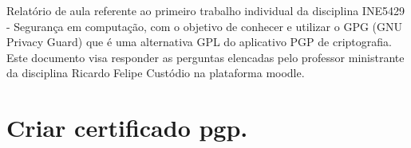 \documentclass[
    article,            %
    11pt,               %
    oneside,            %
    a4paper,            %
    english,            %
    brazil,             %
    sumario=tradicional,
    ]{abntex2}
\begin{document}

\frenchspacing 


%
%

\maketitle


\begin{resumoumacoluna}
    Relatório de aula referente ao primeiro trabalho individual da disciplina INE5429 - Segurança em computação, com o objetivo de conhecer e utilizar o GPG (GNU Privacy Guard) que é uma alternativa GPL do aplicativo PGP de criptografia. Este documento visa responder as perguntas elencadas pelo professor ministrante da disciplina Ricardo Felipe Custódio na plataforma moodle.
 
 \vspace{\onelineskip}
 
\end{resumoumacoluna}


\textual



\section{Criar certificado pgp.}
\end{document}
